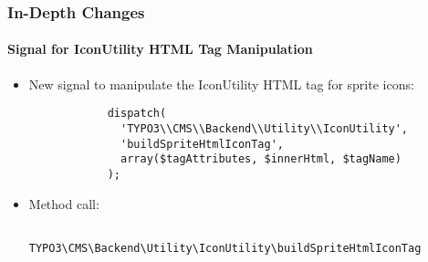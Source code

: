 \begin{frame}[fragile]
	\frametitle{In-Depth Changes}
	\framesubtitle{Signal for IconUtility HTML Tag Manipulation}

	\lstset{
		basicstyle=\tiny\ttfamily
	}

	\begin{itemize}

		\item New signal to manipulate the IconUtility HTML tag for sprite icons:

		\begin{lstlisting}
			dispatch(
			  'TYPO3\\CMS\\Backend\\Utility\\IconUtility',
			  'buildSpriteHtmlIconTag',
			  array($tagAttributes, $innerHtml, $tagName)
			);
		\end{lstlisting}

		\item Method call:

		\begin{lstlisting}
			TYPO3\CMS\Backend\Utility\IconUtility\buildSpriteHtmlIconTag
		\end{lstlisting}

	\end{itemize}

\end{frame}


